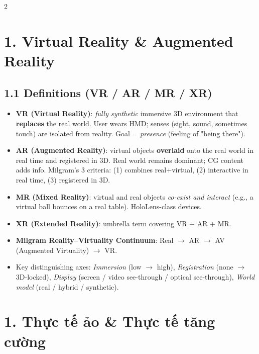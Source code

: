 \begin{paracol}{2}

\section*{1. Virtual Reality \& Augmented Reality}
\subsection*{1.1 Definitions (VR / AR / MR / XR)}
\begin{itemize}[leftmargin=*,nosep]
  \item \textbf{VR (Virtual Reality)}: \emph{fully synthetic} immersive 3D environment that \textbf{replaces} the real world. User wears HMD; senses (sight, sound, sometimes touch) are isolated from reality. Goal = \emph{presence} (feeling of "being there").
  \item \textbf{AR (Augmented Reality)}: virtual objects \textbf{overlaid} onto the real world in real time and registered in 3D. Real world remains dominant; CG content adds info. Milgram's 3 criteria: (1) combines real+virtual, (2) interactive in real time, (3) registered in 3D.
  \item \textbf{MR (Mixed Reality)}: virtual and real objects \emph{co-exist and interact} (e.g., a virtual ball bounces on a real table). HoloLens-class devices.
  \item \textbf{XR (Extended Reality)}: umbrella term covering VR + AR + MR.
  \item \textbf{Milgram Reality–Virtuality Continuum}: Real $\to$ AR $\to$ AV (Augmented Virtuality) $\to$ VR.
  \item Key distinguishing axes: \emph{Immersion} (low $\to$ high), \emph{Registration} (none $\to$ 3D-locked), \emph{Display} (screen / video see-through / optical see-through), \emph{World model} (real / hybrid / synthetic).
\end{itemize}

\switchcolumn

\section*{1. Thực tế ảo \& Thực tế tăng cường}

\end{paracol}
